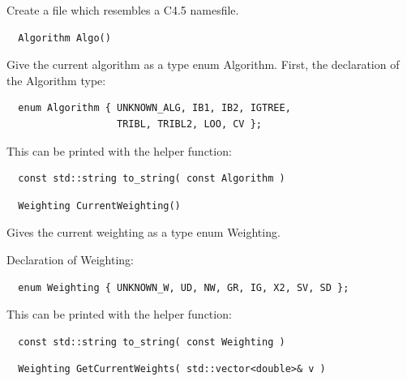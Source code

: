 \documentclass{report}
\begin{document}
Create a file which resembles a C4.5 namesfile.

\begin{footnotesize}
\begin{verbatim}
  Algorithm Algo()
\end{verbatim}
\end{footnotesize}

Give the current algorithm as a type enum Algorithm. First, the
declaration of the Algorithm type:

\begin{footnotesize}
\begin{verbatim}
  enum Algorithm { UNKNOWN_ALG, IB1, IB2, IGTREE,
                   TRIBL, TRIBL2, LOO, CV };
\end{verbatim}
\end{footnotesize}

This can be printed with the helper function:

\begin{footnotesize}
\begin{verbatim}
  const std::string to_string( const Algorithm )
\end{verbatim}
\end{footnotesize}

\begin{footnotesize}
\begin{verbatim}
  Weighting CurrentWeighting()
\end{verbatim}
\end{footnotesize}

Gives the current weighting as a type enum Weighting.

Declaration of Weighting:

\begin{footnotesize}
\begin{verbatim}
  enum Weighting { UNKNOWN_W, UD, NW, GR, IG, X2, SV, SD };
\end{verbatim}
\end{footnotesize}

This can be printed with the helper function:

\begin{footnotesize}
\begin{verbatim}
  const std::string to_string( const Weighting )
\end{verbatim}
\end{footnotesize}


\begin{footnotesize}
\begin{verbatim}
  Weighting GetCurrentWeights( std::vector<double>& v )
\end{verbatim}
\end{footnotesize}
\end{document}
